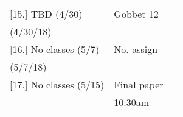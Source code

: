 \documentclass[article,oneside]{memoir}
\begin{document}
\begin{center}
\begin{longtable}{p{4.5cm}p{2cm}p{6cm}}
[15.] TBD (4/30)					& Gobbet 12			& \\ 
(4/30/18)				 		     	&			       	& \\ [1.8\baselineskip]

[16.] No classes (5/7)		    		& No. assign			& \\ 
(5/7/18)				    		  	& 			     	& \\ [1.8\baselineskip]

[17.] No classes (5/15)			    	& Final paper		& \\ 
				      				&  10:30am    		& \\

\end{longtable}
\end{center}



\end{document}
